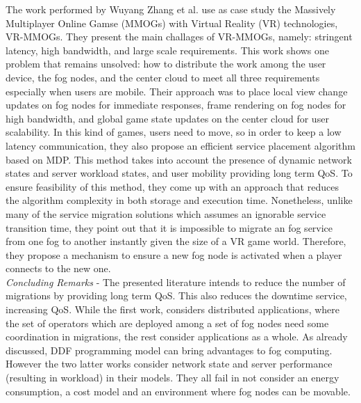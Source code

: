 \noindent\tab The work performed by Wuyang Zhang et al. \cite{zhang2017towards} use as case study the Massively Multiplayer Online Gamse (MMOGs) with Virtual Reality (VR) technologies, VR-MMOGs. They present the main challages of VR-MMOGs, namely: stringent latency, high bandwidth, and large scale requirements. This work shows one problem that remains unsolved: how to distribute the work among the user device, the fog nodes, and the center cloud to meet all three requirements especially when users are mobile. Their approach was to place local view change updates on fog nodes for immediate responses, frame rendering on fog nodes for high bandwidth, and global game state updates on the center cloud for user scalability. In this kind of games, users need to move, so in order to keep a low latency communication, they also propose an efficient service placement algorithm based on MDP. This method takes into account the presence of dynamic network states and server workload states, and user mobility providing long term QoS. To ensure feasibility of this method, they come up with an approach that reduces the algorithm complexity in both storage and execution time. Nonetheless, unlike many of the service migration solutions which assumes an ignorable service transition time, they point out that it is impossible to migrate an fog service from one fog to another instantly given the size of a VR game world. Therefore, they propose a mechanism to ensure a new fog node is activated when a player connects to the new one. \\[6pt]
\textit{Concluding Remarks} - The presented literature intends to reduce the number of migrations by providing long term QoS. This also reduces the downtime service, increasing QoS. While the first work, considers distributed applications, where the set of operators which are deployed among a set of fog nodes need some coordination in migrations, the rest consider applications as a whole. As already discussed, DDF programming model can bring advantages to fog computing. However the two latter works consider network state and server performance (resulting in workload) in their models. They all fail in not consider an energy consumption, a cost model and an environment where fog nodes can be movable.

